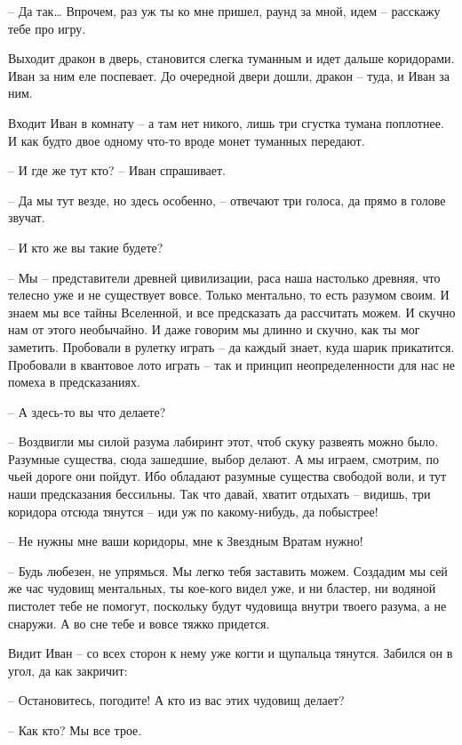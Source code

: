 \documentclass[ebook,oneside,final,openright]{memoir}
\begin{document}
– Да так… Впрочем, раз уж ты ко мне пришел, раунд за мной, идем – расскажу тебе про игру.\par
\par
Выходит дракон в дверь, становится слегка туманным и идет дальше коридорами. Иван за ним еле поспевает. До очередной двери дошли, дракон – туда, и Иван за ним. \par
Входит Иван в комнату – а там нет никого, лишь три сгустка тумана поплотнее. И как будто двое одному что-то вроде монет туманных передают.\par
– И где же тут кто? – Иван спрашивает.\par
– Да мы тут везде, но здесь особенно, – отвечают три голоса, да прямо в голове звучат.\par
– И кто же вы такие будете?\par
– Мы – представители древней цивилизации, раса наша настолько древняя, что телесно уже и не существует вовсе. Только ментально, то есть разумом своим. И знаем мы все тайны Вселенной, и все предсказать да рассчитать можем. И скучно нам от этого необычайно. И даже говорим мы длинно и скучно, как ты мог заметить. Пробовали в рулетку играть – да каждый знает, куда шарик прикатится. Пробовали в квантовое лото играть – так и принцип неопределенности для нас не помеха в предсказаниях.\par
– А здесь-то вы что делаете?\par
– Воздвигли мы силой разума лабиринт этот, чтоб скуку развеять можно было. Разумные существа, сюда зашедшие, выбор делают. А мы играем, смотрим, по чьей дороге они пойдут. Ибо обладают разумные существа свободой воли, и тут наши предсказания бессильны. Так что давай, хватит отдыхать – видишь, три коридора отсюда тянутся – иди уж по какому-нибудь, да побыстрее!\par
– Не нужны мне ваши коридоры, мне к Звездным Вратам нужно!\par
– Будь любезен, не упрямься. Мы легко тебя заставить можем. Создадим мы сей же час чудовищ ментальных, ты кое-кого видел уже, и ни бластер, ни водяной пистолет тебе не помогут, поскольку будут чудовища внутри твоего разума, а не снаружи. А во сне тебе и вовсе тяжко придется.\par
\par
Видит Иван – со всех сторон к нему уже когти и щупальца тянутся. Забился он в угол, да как закричит:\par
– Остановитесь, погодите! А кто из вас этих чудовищ делает?\par
– Как кто? Мы все трое.\par
\end{document}
